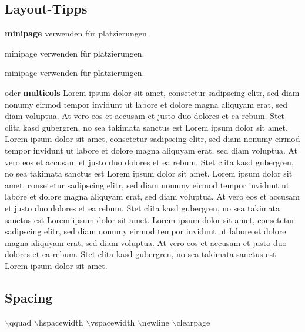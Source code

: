 \subsection{Layout-Tipps}
\begin{minipage}{0.5\linewidth}
    \textbf{minipage} verwenden für platzierungen.
\end{minipage}
\begin{minipage}{0.2\linewidth}
    minipage verwenden für platzierungen.
\end{minipage}
\begin{minipage}{0.3\linewidth}
    minipage verwenden für platzierungen.
\end{minipage}
\vspace{1cm}
\begin{multicols}{2}
    oder \textbf{multicols}\newline
    Lorem ipsum dolor sit amet, consetetur sadipscing elitr, sed diam nonumy eirmod tempor invidunt ut labore et dolore magna aliquyam erat, sed diam voluptua. At vero eos et accusam et justo duo dolores et ea rebum. Stet clita kasd gubergren, no sea takimata sanctus est Lorem ipsum dolor sit amet. Lorem ipsum dolor sit amet, consetetur sadipscing elitr, sed diam nonumy eirmod tempor invidunt ut labore et dolore magna aliquyam erat, sed diam voluptua. At vero eos et accusam et justo duo dolores et ea rebum. Stet clita kasd gubergren, no sea takimata sanctus est Lorem ipsum dolor sit amet.
    \columnbreak
    Lorem ipsum dolor sit amet, consetetur sadipscing elitr, sed diam nonumy eirmod tempor invidunt ut labore et dolore magna aliquyam erat, sed diam voluptua. At vero eos et accusam et justo duo dolores et ea rebum. Stet clita kasd gubergren, no sea takimata sanctus est Lorem ipsum dolor sit amet. Lorem ipsum dolor sit amet, consetetur sadipscing elitr, sed diam nonumy eirmod tempor invidunt ut labore et dolore magna aliquyam erat, sed diam voluptua. At vero eos et accusam et justo duo dolores et ea rebum. Stet clita kasd gubergren, no sea takimata sanctus est Lorem ipsum dolor sit amet.
\end{multicols}

\subsection{Spacing}
$\backslash$qquad \newline
$\backslash$hspace{width}\newline
$\backslash$vspace{width}\newline
$\backslash$newline\newline
$\backslash$clearpage\newline
\clearpage
